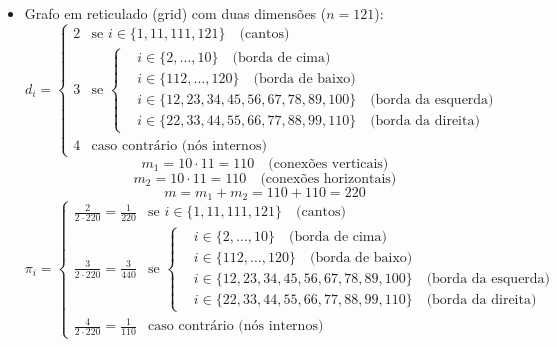 \begin{enumerate}
\begin{resposta}
\begin{itemize}
            \item Grafo em reticulado (grid) com duas dimensões ($n = 121$):
            $$d_i = \begin{cases}         
                2 & \text{se } i \in \{1, 11, 111, 121\} \quad \text{(cantos)} \\
                3 & \text{se } 
                    \begin{cases}
                        & i \in \{2,\dots,10\} \quad \text{(borda de cima)} \\
                        & i \in \{112,\dots,120\} \quad \text{(borda de baixo)} \\
                        & i \in \{12, 23, 34, 45, 56, 67, 78, 89, 100\} \quad \text{(borda da esquerda)} \\
                        & i \in \{22, 33, 44, 55, 66, 77, 88, 99, 110\} \quad \text{(borda da direita)}
                    \end{cases} \\
                4 & \text{caso contrário (nós internos)}
            \end{cases}
            $$
            $$ m_1 = 10 \cdot 11 = 110 \quad \text{(conexões verticais)}$$
            $$ m_2 = 10 \cdot 11 = 110 \quad \text{(conexões horizontais)}$$
            $$ m = m_1 + m_2 = 110 + 110 = 220 $$
            $$\pi_i = \begin{cases}         
                \frac{2}{2 \cdot 220} = \frac{1}{220} & \text{se } i \in \{1, 11, 111, 121\} \quad \text{(cantos)} \\
                \frac{3}{2 \cdot 220} = \frac{3}{440} & \text{se } 
                    \begin{cases}
                        & i \in \{2,\dots,10\} \quad \text{(borda de cima)} \\
                        & i \in \{112,\dots,120\} \quad \text{(borda de baixo)} \\
                        & i \in \{12, 23, 34, 45, 56, 67, 78, 89, 100\} \quad \text{(borda da esquerda)} \\
                        & i \in \{22, 33, 44, 55, 66, 77, 88, 99, 110\} \quad \text{(borda da direita)}
                    \end{cases} \\
                    \frac{4}{2 \cdot 220} = \frac{1}{110} & \text{caso contrário (nós internos)}
            \end{cases}$$
        \end{itemize}
    \end{resposta}


\end{enumerate}
